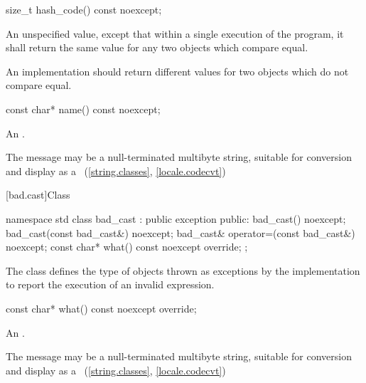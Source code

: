 %
\begin{itemdecl}
size_t hash_code() const noexcept;
\end{itemdecl}

\begin{itemdescr}
\pnum
\returns An unspecified value, except that within a single execution of the
program, it shall return the same value for any two 
objects which compare equal.

\pnum
\remarks An implementation should return different values for two
 objects which do not compare equal.
\end{itemdescr}


%
\begin{itemdecl}
const char* name() const noexcept;
\end{itemdecl}

\begin{itemdescr}
\pnum
\returns
An  \ntbs{}.

\pnum
\remarks
The message may be a null-terminated multibyte string,
suitable for conversion and display as a
~(\ref{string.classes}, \ref{locale.codecvt})
\end{itemdescr}

[bad.cast]{Class }

%
%
\begin{codeblock}
namespace std {
  class bad_cast : public exception {
  public:
    bad_cast() noexcept;
    bad_cast(const bad_cast&) noexcept;
    bad_cast& operator=(const bad_cast&) noexcept;
    const char* what() const noexcept override;
  };
}
\end{codeblock}

\pnum
The class
defines the type of objects thrown
as exceptions by the implementation to report the execution of an invalid
%
expression.

%
\begin{itemdecl}
const char* what() const noexcept override;
\end{itemdecl}

\begin{itemdescr}
\pnum
\returns
An  \ntbs{}.

\pnum
\remarks
The message may be a null-terminated multibyte string,
suitable for conversion and display as a
~(\ref{string.classes}, \ref{locale.codecvt})
\end{itemdescr}

